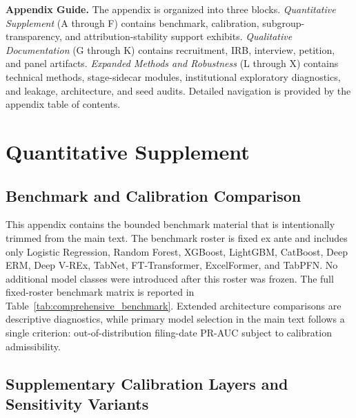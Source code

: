 \documentclass[11pt, letterpaper]{article}
\begin{document}
\cleardoublepage
{}
{}



\appendix

\newpage
\noindent \textbf{Appendix Guide.} The appendix is organized into three blocks. \textit{Quantitative Supplement} (A through F) contains benchmark, calibration, subgroup-transparency, and attribution-stability support exhibits. \textit{Qualitative Documentation} (G through K) contains recruitment, IRB, interview, petition, and panel artifacts. \textit{Expanded Methods and Robustness} (L through X) contains technical methods, stage-sidecar modules, institutional exploratory diagnostics, and leakage, architecture, and seed audits. Detailed navigation is provided by the appendix table of contents.
\newpage
\section{Quantitative Supplement}
\label{app:quantitative_supp}

\subsection{Benchmark and Calibration Comparison}
\label{app:metric_manifest}
\label{app:alt_models}

\noindent This appendix contains the bounded benchmark material that is intentionally trimmed from the main text. The benchmark roster is fixed ex ante and includes only Logistic Regression, Random Forest, XGBoost, LightGBM, CatBoost, Deep ERM, Deep V-REx, TabNet, FT-Transformer, ExcelFormer, and TabPFN. No additional model classes were introduced after this roster was frozen. The full fixed-roster benchmark matrix is reported in Table~\ref{tab:comprehensive_benchmark}. Extended architecture comparisons are descriptive diagnostics, while primary model selection in the main text follows a single criterion: out-of-distribution filing-date PR-AUC subject to calibration admissibility.

\vspace{1em}


\vspace{1em}
\subsection{Supplementary Calibration Layers and Sensitivity Variants}
\label{app:calibration_layers}
\end{document}
